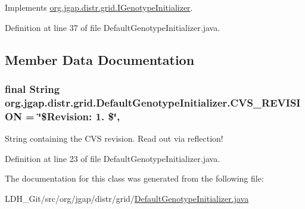 Implements \hyperlink{interfaceorg_1_1jgap_1_1distr_1_1grid_1_1_i_genotype_initializer_af09dd385100d03346dc4c02c1826b584}{org.\-jgap.\-distr.\-grid.\-I\-Genotype\-Initializer}.



Definition at line 37 of file Default\-Genotype\-Initializer.\-java.



\subsection{Member Data Documentation}
\hypertarget{classorg_1_1jgap_1_1distr_1_1grid_1_1_default_genotype_initializer_a215d4d03f358bbf7a085d156b21ba620}{
\subsubsection[{C\-V\-S\-\_\-\-R\-E\-V\-I\-S\-I\-O\-N}]{\setlength{\rightskip}{0pt plus 5cm}final String org.\-jgap.\-distr.\-grid.\-Default\-Genotype\-Initializer.\-C\-V\-S\-\_\-\-R\-E\-V\-I\-S\-I\-O\-N = \char`\"{}\$Revision\-: 1. \$\char`\"{}\hspace{0.3cm}{\ttfamily [static]}, {\ttfamily [private]}}}\label{classorg_1_1jgap_1_1distr_1_1grid_1_1_default_genotype_initializer_a215d4d03f358bbf7a085d156b21ba620}
String containing the C\-V\-S revision. Read out via reflection! 

Definition at line 23 of file Default\-Genotype\-Initializer.\-java.



The documentation for this class was generated from the following file\-:\begin{DoxyCompactItemize}
\item 
L\-D\-H\-\_\-\-Git/src/org/jgap/distr/grid/\hyperlink{_default_genotype_initializer_8java}{Default\-Genotype\-Initializer.\-java}\end{DoxyCompactItemize}
